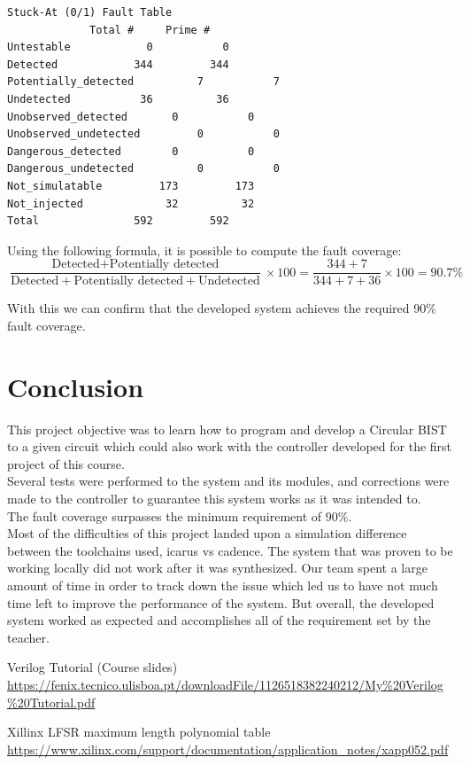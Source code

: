 \documentclass[12pt]{article}
\begin{document}
\begin{lstlisting}[caption={Fault simulator results.},captionpos=b]
Stuck-At (0/1) Fault Table
			 Total #	 Prime #
Untestable		      0		      0
Detected		    344		    344
Potentially_detected	      7		      7
Undetected		     36		     36
Unobserved_detected	      0		      0
Unobserved_undetected	      0		      0
Dangerous_detected	      0		      0
Dangerous_undetected	      0		      0
Not_simulatable		    173		    173
Not_injected		     32		     32
Total			    592		    592
    \end{lstlisting} 
    
Using the following formula, it is possible to compute the fault coverage:
\begin{equation}
    \frac{\text{Detected}+ \text{Potentially detected}}{\text{Detected}+ \text{Potentially detected} + \text{Undetected}}\times 100 = \frac{344+7}{344+7+36}\times 100 = 90.7 \%        
\end{equation}   
    
With this we can confirm that the developed system achieves the required 90\% fault coverage.
    
 \newpage   
	
	\section{Conclusion}
	This project objective was to learn how to program and develop a Circular BIST to a given circuit which could also work with the controller developed for the first project of this course.\\
	Several tests were performed to the system and its modules, and corrections were made to the controller to guarantee this system works as it was intended to.\\
	The fault coverage surpasses the minimum requirement of 90\%.\\
	Most of the difficulties of this project landed upon a simulation difference between the toolchains used, icarus vs cadence. The system that was proven to be working locally did not work after it was synthesized. Our team spent a large amount of time in order to track down the issue which led us to have not much time left to improve the performance of the system. But overall, the developed system worked as expected and accomplishes all of the requirement set by the teacher.




\begin{thebibliography}{20}
Verilog Tutorial (Course slides)\\
\url{https://fenix.tecnico.ulisboa.pt/downloadFile/1126518382240212/My%20Verilog%20Tutorial.pdf}

Xillinx LFSR maximum length polynomial table\\
\url{https://www.xilinx.com/support/documentation/application_notes/xapp052.pdf}



\end{thebibliography}



\end{document}
